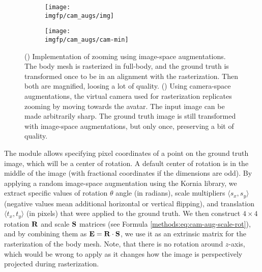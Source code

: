 \begin{figure}[ht]
	\centering
	\begin{subfigure}[b]{0.48\textwidth}
		\centering
		\texttt{[image: \\imgfp/cam\_augs/img]}%
		\caption{}
		\label{fig:cam_aug:before}
	\end{subfigure}
	\begin{subfigure}[b]{0.48\textwidth}
		\centering
		\texttt{[image: \\imgfp/cam\_augs/cam-min]}%
		\caption{}
		\label{fig:cam_aug:after}
	\end{subfigure}
	\caption{(\protect{}) Implementation of zooming using image-space augmentations. The body mesh is rasterized in full-body, and the ground truth is transformed once to be in an alignment with the rasterization. Then both are magnified, loosing a lot of quality. (\protect{}) Using camera-space augmentations, the virtual camera used for rasterization replicates zooming by moving towards the avatar. The input image can be made arbitrarily sharp. The ground truth image is still transformed with image-space augmentations, but only once, preserving a bit of quality.}
	\label{fig:cam_aug}
\end{figure}

The module allows specifying pixel coordinates of a point on the ground truth image, which will be a center of rotation. A default center of rotation is in the middle of the image (with fractional coordinates if the dimensions are odd). By applying a random image-space augmentation using the Kornia library, we extract specific values of rotation $\theta$ angle (in radians), scale multipliers $\langle s_x, s_y \rangle$ (negative values mean additional horizontal or vertical flipping), and translation $\langle t_x, t_y \rangle$ (in pixels) that were applied to the ground truth. We then construct $4\times4$ rotation $\bm{\mathrm{R}}$ and scale $\bm{\mathrm{S}}$ matrices (see Formula \ref{methods:eq:cam-aug-scale-rot}), and by combining them as $\bm{\mathrm{E}} = \bm{\mathrm{R}} \cdot \bm{\mathrm{S}}$, we use it as an extrinsic matrix for the rasterization of the body mesh. Note, that there is no rotation around $z$-axis, which would be wrong to apply as it changes how the image is perspectively projected during rasterization.

